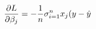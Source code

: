 \documentclass[preview]{standalone}
\begin{document}
\begin{align*}
\special{dvisvgm:raw <g id='unique000'>}\frac{\partial{L}}{\partial\beta_j}=-\frac{1}{n}\sigma^n_{i=1}x_j(y-\hat{y}\special{dvisvgm:raw </g>}
\end{align*}
\end{document}
